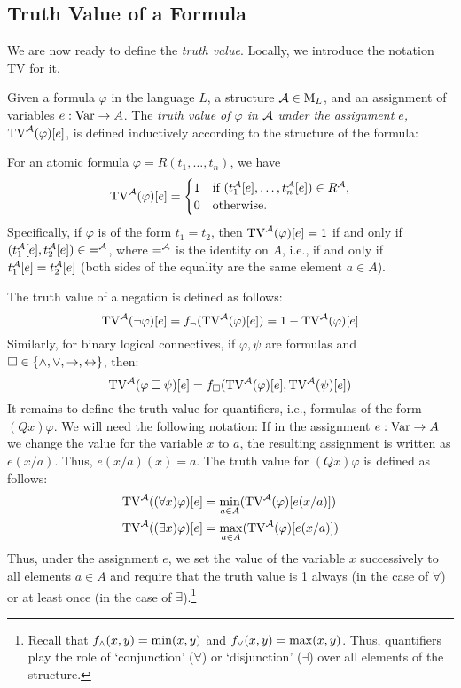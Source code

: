 \subsection{Truth Value of a Formula}\label{subsection:truth-value-of-formula}

We are now ready to define the \emph{truth value}. Locally, we introduce the notation $\mathrm{TV}$ for it.

\begin{definition}
Given a formula $\varphi$ in the language $L$, a structure $\mathcal{A}\in\operatorname{M}_L$, and an assignment of variables $e:\operatorname{Var}\to A$. The \emph{truth value of $\varphi$ in $\mathcal{A}$ under the assignment $e$, $\mathrm{TV}^{\mathcal{A}}(\varphi)[e]$}, is defined inductively according to the structure of the formula:

For an atomic formula $\varphi=R(t_1,\dots,t_n)$, we have 
$$
\mathrm{TV}^{\mathcal{A}}(\varphi)[e]=
\begin{cases}
    1 & \text{if }(t_1^{\mathcal{A}}[e],\dots,t_n^{\mathcal{A}}[e])\in R^{\mathcal{A}},\\
    0 & \text{otherwise.}    
\end{cases}
$$
Specifically, if $\varphi$ is of the form $t_1=t_2$, then $\mathrm{TV}^{\mathcal{A}}(\varphi)[e]=1$ if and only if $(t_1^{\mathcal{A}}[e],t_2^{\mathcal{A}}[e])\in {=^{\mathcal{A}}}$, where $=^{\mathcal{A}}$ is the identity on $A$, i.e., if and only if $t_1^{\mathcal{A}}[e]=t_2^{\mathcal{A}}[e]$ (both sides of the equality are the same element $a\in A$).

The truth value of a negation is defined as follows:
$$
\mathrm{TV}^{\mathcal{A}}(\neg \varphi)[e]=f_\neg(\mathrm{TV}^{\mathcal{A}}(\varphi)[e])=1-\mathrm{TV}^{\mathcal{A}}(\varphi)[e]
$$
Similarly, for binary logical connectives, if $\varphi,\psi$ are formulas and ${\mathbin{\square}}\in\{{\land},{\lor},{\mathbin{\rightarrow}},{\mathbin{\leftrightarrow}}\}$, then:
$$
\mathrm{TV}^{\mathcal{A}}(\varphi\mathbin{\square}\psi)[e]=f_{\mathbin{\square}}(\mathrm{TV}^{\mathcal{A}}(\varphi)[e],\mathrm{TV}^{\mathcal{A}}(\psi)[e])
$$
It remains to define the truth value for quantifiers, i.e., formulas of the form $(Qx)\varphi$. We will need the following notation: If in the assignment $e:\operatorname{Var}\to A$ we change the value for the variable $x$ to $a$, the resulting assignment is written as $e(x/a)$. Thus, $e(x/a)(x)=a$. The truth value for $(Qx)\varphi$ is defined as follows:
\begin{align*}
    \mathrm{TV}^{\mathcal{A}}((\forall x)\varphi)[e]&=\min_{a\in A}(\mathrm{TV}^{\mathcal{A}}(\varphi)[e(x/a)])\\ 
    \mathrm{TV}^{\mathcal{A}}((\exists x)\varphi)[e]&=\max_{a\in A}(\mathrm{TV}^{\mathcal{A}}(\varphi)[e(x/a)])
\end{align*}
Thus, under the assignment $e$, we set the value of the variable $x$ successively to all elements $a\in A$ and require that the truth value is 1 always (in the case of $\forall$) or at least once (in the case of $\exists$).\footnote{Recall that $f_{\land}(x,y)=\min(x,y)$ and $f_{\lor}(x,y)=\max(x,y)$. Thus, quantifiers play the role of `conjunction' ($\forall$) or `disjunction' ($\exists$) over all elements of the structure.}
\end{definition}

